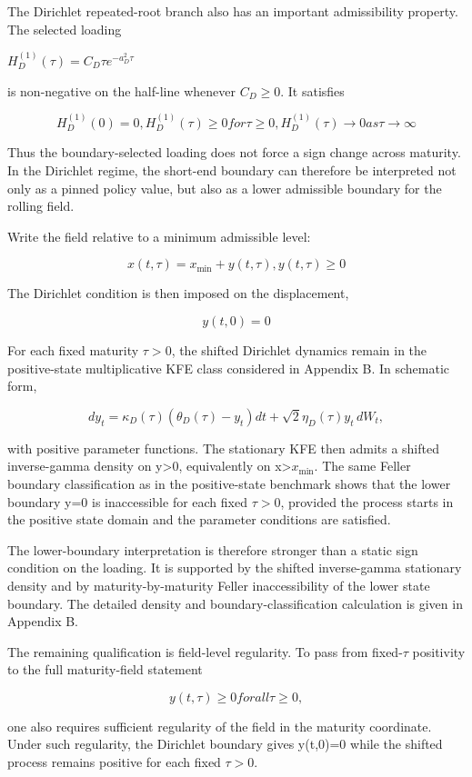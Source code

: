 \documentclass[11pt,oneside]{book}
\begin{document}
The Dirichlet repeated-root branch also has an important admissibility
property. The selected loading

$H_D^{(1)}(\tau)=C_D\tau e^{-a_D^2\tau}$

is non-negative on the half-line whenever $C_D\geq0$. It satisfies

\[
H_D^{(1)}(0)=0, H_D^{(1)}(\tau)\ge0 for \tau\ge0, H_D^{(1)}(\tau)\to0 as \tau\to\infty
\]

Thus the boundary-selected loading does not force a sign change across
maturity. In the Dirichlet regime, the short-end boundary can therefore
be interpreted not only as a pinned policy value, but also as a lower
admissible boundary for the rolling field.

Write the field relative to a minimum admissible level:

\[
x(t,\tau)=x_{\min}+y(t,\tau), y(t,\tau)\ge0
\]

The Dirichlet condition is then imposed on the displacement,

\[
y(t,0)=0
\]

For each fixed maturity $\tau>0$, the shifted Dirichlet dynamics
remain in the positive-state multiplicative KFE class considered in
Appendix B. In schematic form,

\[
dy_t=\kappa_D(\tau)(\theta_D(\tau)-y_t)dt+\sqrt{2} \eta_D(\tau)y_t\,dW_t,
\]

with positive parameter functions. The stationary KFE then admits a
shifted inverse-gamma density on y\textgreater0, equivalently on
x\textgreater $x_{\min}$. The same Feller boundary classification as in the
positive-state benchmark shows that the lower boundary y=0 is
inaccessible for each fixed $\tau>0$, provided the process starts
in the positive state domain and the parameter conditions are satisfied.

The lower-boundary interpretation is therefore stronger than a static
sign condition on the loading. It is supported by the shifted
inverse-gamma stationary density and by maturity-by-maturity Feller
inaccessibility of the lower state boundary. The detailed density and
boundary-classification calculation is given in Appendix B.

The remaining qualification is field-level regularity. To pass from
fixed-$\tau$ positivity to the full maturity-field statement

\[
y(t,\tau)\ge0 for all \tau\ge0,
\]

one also requires sufficient regularity of the field in the maturity
coordinate. Under such regularity, the Dirichlet boundary gives y(t,0)=0
while the shifted process remains positive for each fixed
$\tau>0$.
\end{document}
